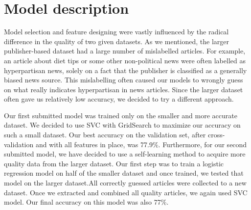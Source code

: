 \section{Model description}
\label{sec:model}

Model selection and feature designing were vastly influenced by the radical difference in the quality of two given datasets. As we mentioned, the larger publisher-based dataset had a large number of mislabelled articles. For example, an article about diet tips or some other non-political news were often labelled as hyperpartisan news, solely on a fact that the publisher is classified as a generally biased news source. This mislabelling often caused our models to wrongly guess on what really indicates hyperpartisan in news articles. Since the larger dataset often gave us relatively low accuracy, we decided to try a different approach. 

Our first submitted model was trained only on the smaller and more accurate dataset. We decided to use SVC with GridSearch to maximize our accuracy on such a small dataset. Our best accuracy on the validation set, after cross-validation and with all features in place, was 77.9\%. Furthermore, for our second submitted model, we have decided to use a self-learning method to acquire more quality data from the larger dataset. Our first step was to train a logistic regression model on half of the smaller dataset and once trained, we tested that model on the larger dataset.All correctly guessed articles were collected to a new dataset. Once we extracted and combined all quality articles, we again used SVC model. Our final accuracy on this model was also 77\%.